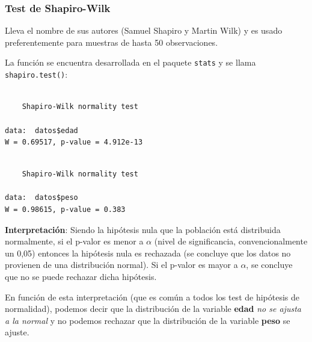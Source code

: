 \documentclass[
  spanish,
  a4paper,
]{scrbook}
\newenvironment{Shaded}{\begin{snugshade}}{\end{snugshade}}
\newcommand{\FunctionTok}[1]{\textcolor[rgb]{0.28,0.35,0.67}{#1}}
\newcommand{\NormalTok}[1]{\textcolor[rgb]{0.00,0.23,0.31}{#1}}
\newcommand{\SpecialCharTok}[1]{\textcolor[rgb]{0.37,0.37,0.37}{#1}}
\begin{document}
\subsubsection{Test de Shapiro-Wilk}\label{test-de-shapiro-wilk}

Lleva el nombre de sus autores (Samuel Shapiro y Martin Wilk) y es usado
preferentemente para muestras de hasta 50 observaciones.

La función se encuentra desarrollada en el paquete \texttt{stats} y se
llama \texttt{shapiro.test()}:

\begin{Shaded}
\end{Shaded}

\begin{verbatim}

    Shapiro-Wilk normality test

data:  datos$edad
W = 0.69517, p-value = 4.912e-13
\end{verbatim}

\begin{Shaded}
\end{Shaded}

\begin{verbatim}

    Shapiro-Wilk normality test

data:  datos$peso
W = 0.98615, p-value = 0.383
\end{verbatim}

\textbf{Interpretación}: Siendo la hipótesis nula que la población está
distribuida normalmente, si el p-valor es menor a \(\alpha\) (nivel de
significancia, convencionalmente un 0,05) entonces la hipótesis nula es
rechazada (se concluye que los datos no provienen de una distribución
normal). Si el p-valor es mayor a \(\alpha\), se concluye que no se
puede rechazar dicha hipótesis.

En función de esta interpretación (que es común a todos los test de
hipótesis de normalidad), podemos decir que la distribución de la
variable \textbf{edad} \emph{no se ajusta a la normal} y no podemos
rechazar que la distribución de la variable \textbf{peso} se ajuste.
\end{document}
